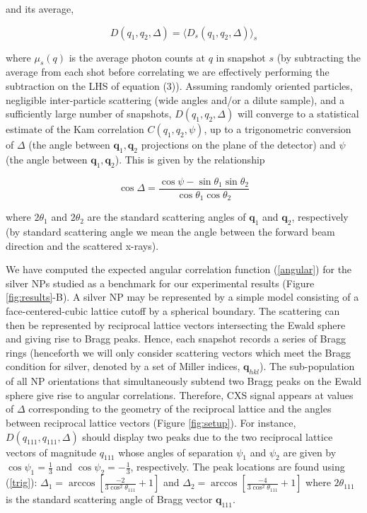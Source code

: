 \documentclass [11pt,fleqn]{article}
\def \be {\begin{equation}}
\def \ee {\end{equation}}
\begin{document}
and its average,

\be \label{angular}
D(q_1,q_2, \Delta  ) = \big \langle D_s(q_1,q_2, \Delta  ) \big \rangle_{s}
\ee

where $\mu_s( q)$ is the average photon counts at $q$ in snapshot $s$ (by subtracting the average from each shot before correlating we are effectively performing the subtraction on the LHS of equation (3)). Assuming randomly oriented particles, negligible inter-particle scattering (wide angles and/or a dilute sample), and a sufficiently large number of snapshots, $D (q_1,q_2, \Delta)$ will converge to a statistical estimate of the Kam correlation $C (q_1,q_2, \psi)$, up to a trigonometric conversion of $\Delta$ (the angle between $\bm q_1, \bm q_2$ projections on the plane of the detector) and $\psi$ (the angle between $\bm q_1, \bm q_2$). This is given by the relationship

\be\label{trig}
\cos \Delta = \frac{\cos \psi - \sin \theta_1 \sin \theta_2  }{ \cos \theta_1 \cos \theta_2} 
\ee

where $2 \theta_1$ and $2 \theta_2$ are the standard scattering angles of $\bm q_1$ and $\bm q_2$, respectively (by standard scattering angle we mean the angle between the forward beam direction and the scattered x-rays).

We have computed the expected angular correlation function (\ref{angular}) for the silver NPs studied as a benchmark for our experimental results (Figure \ref{fig:results}-B). A silver NP may be represented by a simple model consisting of a face-centered-cubic lattice cutoff by a spherical boundary. The scattering can then be represented by reciprocal lattice vectors intersecting the Ewald sphere and giving rise to Bragg peaks. Hence, each snapshot records a series of Bragg rings (henceforth we will only consider scattering vectors which meet the Bragg condition for silver, denoted by a set of Miller indices, $\bm q_{hkl}$). The sub-population of all NP orientations that simultaneously subtend two Bragg peaks on the Ewald sphere give rise to angular correlations. Therefore,  CXS signal appears at values of $\Delta $ corresponding to the geometry of the reciprocal lattice and the angles between reciprocal lattice vectors (Figure \ref{fig:setup}). For instance, $D (q_{111},q_{111}, \Delta  )$ should display two peaks due to the two reciprocal lattice vectors of magnitude $q_{111}$ whose angles of separation $\psi_1$ and $\psi_2$ are given by $\cos \psi_1 = \frac{1}{3}$ and $\cos \psi_2 = -\frac{1}{3} $, respectively. The peak locations are found using (\ref{trig}):   $\Delta_1 = \arccos[ \frac{-2}{3\cos^{2}\theta_{111}} + 1  ]$ and $\Delta_2 = \arccos[ \frac{-4}{3\cos^{2}\theta_{111}} + 1  ]$ where $2\theta_{111}$ is the standard scattering angle of Bragg vector $\bm q_{111}$.
\end{document}
